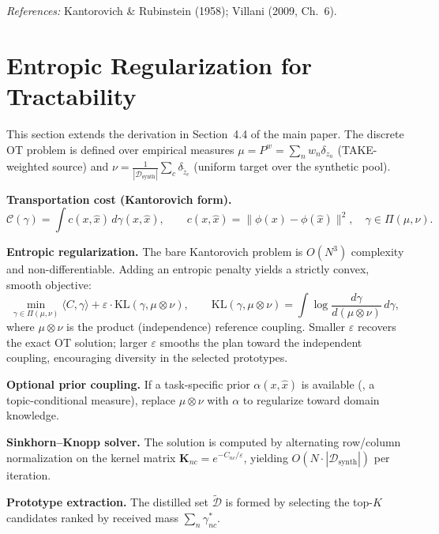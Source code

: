 \noindent\textit{References:} Kantorovich \& Rubinstein (1958); Villani (2009, Ch.~6).


\section{Entropic Regularization for Tractability}
\label{app:method}

This section extends the derivation in Section~4.4 of the main paper.
The discrete OT problem is defined over empirical measures $\mu = P^w = \sum_n w_n \delta_{z_n}$ (TAKE-weighted source) and $\nu = \frac{1}{|\mathcal{D}_\text{synth}|}\sum_c \delta_{\tilde{z}_c}$ (uniform target over the synthetic pool).

\textbf{Transportation cost (Kantorovich form).}
\begin{equation}
    \mathcal{C}(\gamma)
    = \int c(x,\hat{x})\,d\gamma(x,\hat{x}),
    \qquad c(x,\hat{x}) = \|\phi(x) - \phi(\hat{x})\|^2,
    \quad \gamma \in \Pi(\mu,\nu).
\end{equation}

\textbf{Entropic regularization.}
The bare Kantorovich problem is $O(N^3)$ complexity and non-differentiable.
Adding an entropic penalty yields a strictly convex, smooth objective:
\begin{equation}
    \min_{\gamma \in \Pi(\mu,\nu)}
    \langle C, \gamma \rangle
    + \varepsilon \cdot \mathrm{KL}(\gamma, \mu \otimes \nu),
    \qquad
    \mathrm{KL}(\gamma, \mu \otimes \nu)
    = \int \log\frac{d\gamma}{d(\mu \otimes \nu)}\,d\gamma,
\end{equation}
where $\mu \otimes \nu$ is the product (independence) reference coupling.
Smaller $\varepsilon$ recovers the exact OT solution; larger $\varepsilon$ smooths the plan toward the independent coupling, encouraging diversity in the selected prototypes.

\textbf{Optional prior coupling.}
If a task-specific prior $\alpha(x,\hat{x})$ is available (\eg, a topic-conditional measure), replace $\mu \otimes \nu$ with $\alpha$ to regularize toward domain knowledge.

\textbf{Sinkhorn--Knopp solver.}
The solution is computed by alternating row/column normalization on the kernel matrix $\mathbf{K}_{nc} = e^{-C_{nc}/\varepsilon}$, yielding $O(N \cdot |\mathcal{D}_\text{synth}|)$ per iteration.

\textbf{Prototype extraction.}
The distilled set $\tilde{\mathcal{D}}$ is formed by selecting the top-$K$ candidates ranked by received mass $\sum_n \gamma^*_{nc}$.


